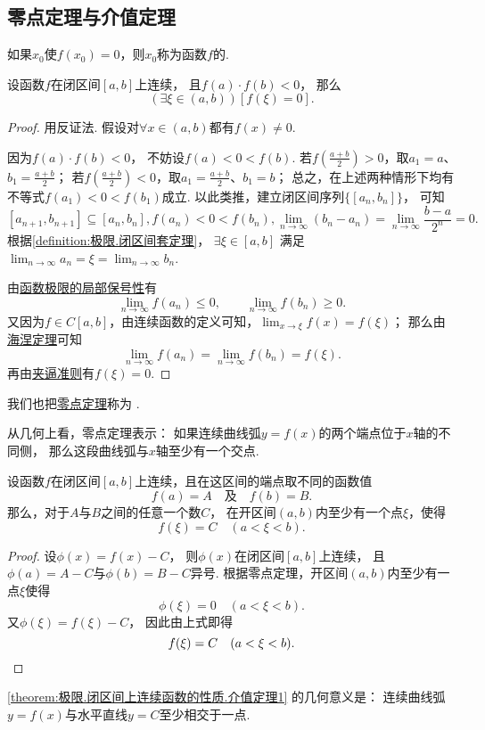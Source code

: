 \subsection{零点定理与介值定理}
\begin{definition}
如果\(x_0\)使\(f(x_0) = 0\)，则\(x_0\)称为函数\(f\)的.
\end{definition}

\begin{theorem}[零点定理]\label{theorem:极限.零点定理}
设函数\(f\)在闭区间\([a,b]\)上连续，
且\(f(a) \cdot f(b)<0\)，
那么\[
	(\exists\xi\in(a,b))[f(\xi) = 0].
\]
\begin{proof}
用反证法.
假设对\(\forall x\in(a,b)\)都有\(f(x) \neq 0\).

因为\(f(a) \cdot f(b)<0\)，
不妨设\(f(a) < 0 < f(b)\).
若\(f\left(\frac{a+b}{2}\right)>0\)，取\(a_1=a\)、\(b_1=\frac{a+b}{2}\)；
若\(f\left(\frac{a+b}{2}\right)<0\)，取\(a_1=\frac{a+b}{2}\)、\(b_1=b\)；
总之，在上述两种情形下均有不等式\(f(a_1) < 0 < f(b_1)\)成立.
以此类推，建立闭区间序列\(\{[a_n,b_n]\}\)，
可知\[
	[a_{n+1},b_{n+1}] \subseteq [a_n,b_n],
	f(a_n) < 0 < f(b_n),
	\lim_{n\to\infty} (b_n - a_n)
	= \lim_{n\to\infty} \frac{b-a}{2^n}
	= 0.
\]
根据\cref{definition:极限.闭区间套定理}，
\(\exists\xi\in[a,b]\)
满足\(\lim_{n\to\infty} a_n
= \xi
= \lim_{n\to\infty} b_n\).

由\hyperref[theorem:极限.函数极限的局部保号性3]{函数极限的局部保号性}有\[
	\lim_{n\to\infty} f(a_n) \leq 0,
	\qquad
	\lim_{n\to\infty} f(b_n) \geq 0.
\]
又因为\(f \in C[a,b]\)，由连续函数的定义可知，\(\lim_{x\to\xi} f(x) = f(\xi)\)；
那么由\hyperref[theorem:极限.海涅定理]{海涅定理}可知\[
	\lim_{n\to\infty} f(a_n)
	= \lim_{n\to\infty} f(b_n)
	= f(\xi).
\]
再由\hyperref[theorem:函数极限.夹逼准则]{夹逼准则}有\(f(\xi)=0\).
\end{proof}
\end{theorem}
我们也把\hyperref[theorem:极限.零点定理]{零点定理}称为%
.

从几何上看，零点定理表示：
如果连续曲线弧\(y = f(x)\)的两个端点位于\(x\)轴的不同侧，
那么这段曲线弧与\(x\)轴至少有一个交点.

\begin{theorem}[介值定理]\label{theorem:极限.闭区间上连续函数的性质.介值定理1}
设函数\(f\)在闭区间\([a,b]\)上连续，且在这区间的端点取不同的函数值\[
	f(a) = A
	\quad\text{及}\quad
	f(b) = B.
\]
那么，对于\(A\)与\(B\)之间的任意一个数\(C\)，
在开区间\((a,b)\)内至少有一个点\(\xi\)，使得\[
	f(\xi)=C
	\quad(a<\xi<b).
\]
\begin{proof}
设\(\phi(x)=f(x)-C\)，
则\(\phi(x)\)在闭区间\([a,b]\)上连续，
且\(\phi(a)=A-C\)与\(\phi(b)=B-C\)异号.
根据零点定理，开区间\((a,b)\)内至少有一点\(\xi\)使得\[
	\phi(\xi)=0
	\quad(a<\xi<b).
\]
又\(\phi(\xi)=f(\xi)-C\)，
因此由上式即得\[
	f(\xi)=C
	\quad(a<\xi<b).
	\qedhere
\]
\end{proof}
\end{theorem}
\cref{theorem:极限.闭区间上连续函数的性质.介值定理1} 的几何意义是：
连续曲线弧\(y=f(x)\)与水平直线\(y=C\)至少相交于一点.

